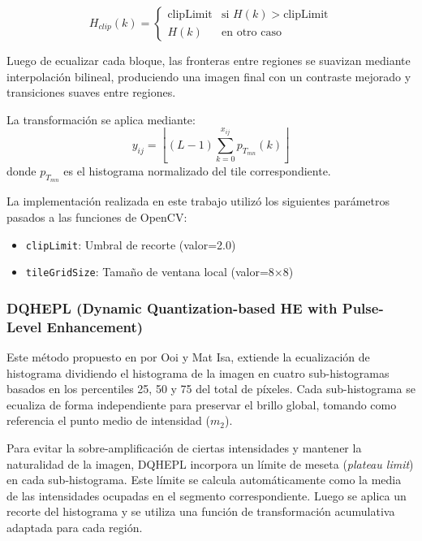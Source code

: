 \documentclass[sigchi]{acmart}
\begin{document}
\begin{equation}
	H_{clip}(k) =
	\begin{cases}
		\text{clipLimit} & \text{si } H(k) > \text{clipLimit} \\
		H(k)             & \text{en otro caso}
	\end{cases}
\end{equation}

Luego de ecualizar cada bloque, las fronteras entre regiones se suavizan mediante interpolación
bilineal, produciendo una imagen final con un contraste mejorado y transiciones suaves entre
regiones.

La transformación se aplica mediante:
\begin{equation}
	y_{ij} = \left\lfloor (L-1) \sum_{k=0}^{x_{ij}} p_{T_{mn}}(k) \right\rfloor
\end{equation}
donde $p_{T_{mn}}$ es el histograma normalizado del tile correspondiente.

La implementación realizada en este trabajo utilizó los siguientes parámetros pasados a las
funciones de OpenCV:
\begin{itemize}
	\item \texttt{clipLimit}: Umbral de recorte (valor=2.0)
	\item \texttt{tileGridSize}: Tamaño de ventana local (valor=8×8)
\end{itemize}

\subsubsection{\textbf{DQHEPL (Dynamic Quantization-based HE with Pulse-Level Enhancement)}}
\label{sssec:dqhepl}

Este método propuesto en por Ooi y Mat Isa\cite{paper}, extiende la ecualización de histograma
dividiendo el histograma de la imagen en cuatro sub-histogramas basados en los percentiles 25,
50 y 75 del total de píxeles. Cada sub-histograma se ecualiza de forma independiente para
preservar el brillo global, tomando como referencia el punto medio de intensidad (\(m_2\)).

Para evitar la sobre-amplificación de ciertas intensidades y mantener la naturalidad de la
imagen, DQHEPL incorpora un límite de meseta (\textit{plateau limit}) en cada sub-histograma.
Este límite se calcula automáticamente como la media de las intensidades ocupadas en el
segmento correspondiente. Luego se aplica un recorte del histograma y se utiliza una función de
transformación acumulativa adaptada para cada región.
\end{document}
